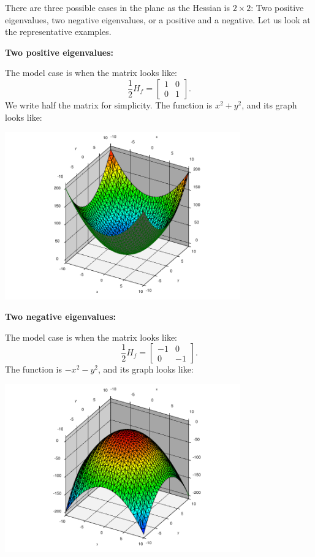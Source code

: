 \documentclass[12pt]{article}
\begin{document}
There are three possible cases in the plane as the Hessian
is $2 \times 2$:  Two positive eigenvalues,
two negative eigenvalues, or a positive and a negative.
Let us look at the representative examples.

\bigskip

\textbf{Two positive eigenvalues:}
\nopagebreak

The model case is when the matrix looks like:
\begin{equation*}
\frac{1}{2} H_f
=
\begin{bmatrix}
1 & 0 \\
0 & 1
\end{bmatrix} .
\end{equation*}
We write half the matrix for simplicity.
The function is $x^2+y^2$, and
its graph looks like:
\begin{center}
\includegraphics[width=4.0in]{xsqplusysq}
\end{center}

\bigskip

\pagebreak[2]
\textbf{Two negative eigenvalues:}

The model case is when the matrix looks like:
\begin{equation*}
\frac{1}{2} H_f
=
\begin{bmatrix}
-1 & 0 \\
0 & -1
\end{bmatrix} .
\end{equation*}
The function is $-x^2-y^2$, and
its graph looks like:
\begin{center}
\includegraphics[width=4.0in]{minusxsqminusysq}
\end{center}
\end{document}
